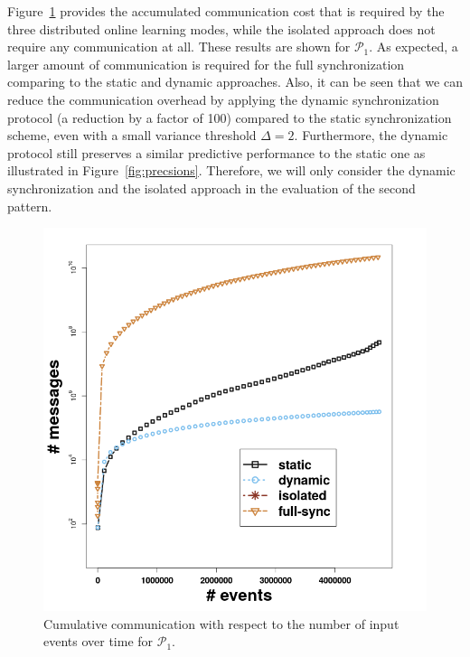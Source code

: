 \par Figure~\ref{fig:comm} provides the accumulated communication cost that is required by the three distributed online learning modes, while the isolated approach does not require any communication at all. These results are shown for $\mathcal{P}_1$.  As expected, a larger amount of communication is required for the full synchronization comparing to the static and dynamic approaches. Also, it can be seen that we can reduce the communication overhead by applying the dynamic synchronization protocol (a reduction by a factor of 100) compared to the static synchronization scheme, even with a small variance threshold $\Delta=2$. Furthermore, the dynamic  protocol still preserves a similar predictive performance to the static one as illustrated in Figure~\ref{fig:precsions}.  Therefore, we will only consider the dynamic synchronization and the isolated approach in the evaluation of the second pattern.

\begin{center}
	
	\begin{figure}[H]
		\centering
		\includegraphics[width=\textwidth,height=.62\textheight]{chapters/figures/synopses/p1_messages_100_2_08.png}
		
		\caption{Cumulative communication with respect to the number of input events over time for $\mathcal{P}_1$.}
		\label{fig:comm}
	\end{figure}
\end{center}




